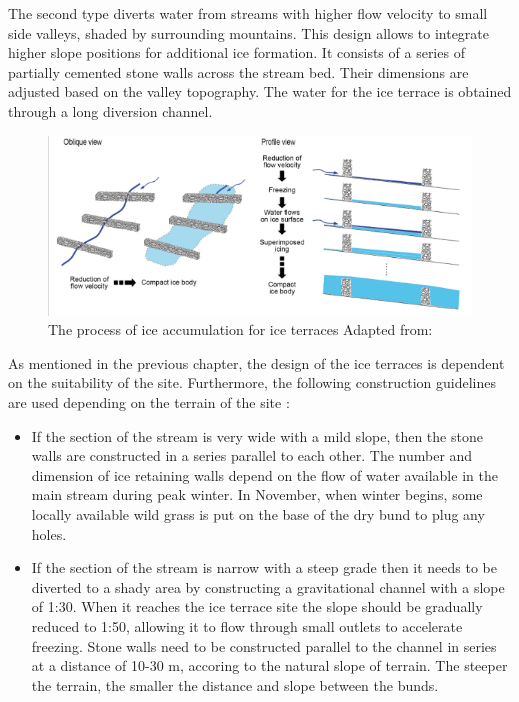 The second type diverts water from streams with higher flow velocity to small side valleys, shaded by
surrounding mountains. This design allows to integrate higher slope positions for additional ice formation. It
consists of a series of partially cemented stone walls across the stream bed. Their dimensions are adjusted
based on the valley topography. The water for the ice terrace is obtained through a long diversion channel.

\begin{figure}[htb]
\centering
\includegraphics[width=12cm]{figs/IT_science.png}

\caption{ The process of ice accumulation for ice terraces Adapted from:
\cite{nusserSociohydrologyArtificialGlaciers2019}}

\label{fig:ITscience}
\end{figure}

As mentioned in the previous chapter, the design of the ice terraces is dependent on the suitability of the
site. Furthermore, the following construction guidelines are used depending on the terrain of the site
\cite{norphelSnowWaterHarvesting2015}:

\begin{itemize}

  \item If the section of the stream is very wide with a mild slope, then the stone walls are
    constructed in a series parallel to each other. The number and dimension of ice retaining walls depend on
    the flow of water available in the main stream during peak winter. In November, when winter begins, some
    locally available wild grass is put on the base of the dry bund to plug any holes.

  \item If the section of the stream is narrow with a steep grade then it needs to be diverted to a shady area
    by constructing a gravitational channel with a slope of 1:30. When it reaches the ice terrace site the slope
    should be gradually reduced to 1:50, allowing it to flow through small outlets to accelerate freezing. Stone
    walls need to be constructed parallel to the channel in series at a distance of 10-30 m, accoring to the
    natural slope of terrain. The steeper the terrain, the smaller the distance and slope between the bunds.

\end{itemize}


